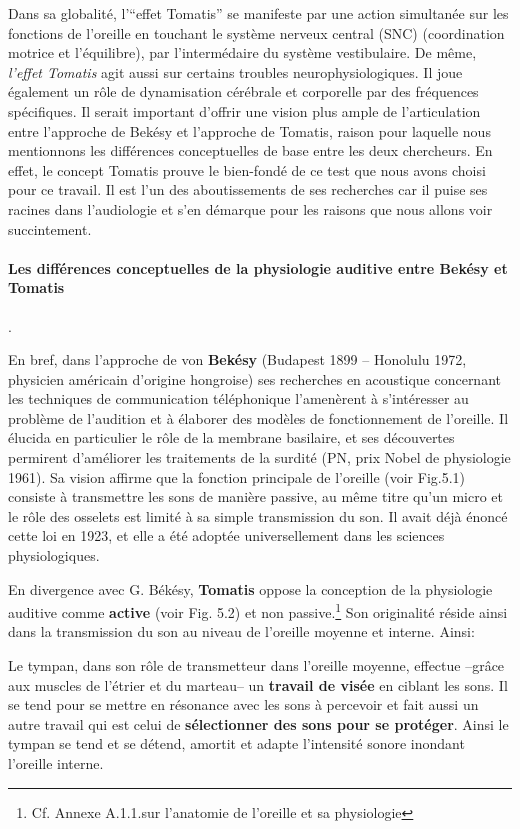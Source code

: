 Dans sa globalité, l'``effet Tomatis'' se manifeste par une action
simultanée sur les fonctions de
l'oreille en touchant le système nerveux central (SNC) (coordination
                motrice et l'équilibre), par l'intermédaire du système
                vestibulaire.
De même, \textit{l'effet Tomatis} agit aussi sur certains troubles
                neurophysiologiques.
                Il joue également un rôle de dynamisation cérébrale et corporelle
               par des fréquences spécifiques.
Il serait important d'offrir une vision plus ample de
l'articulation entre l'approche de Bekésy et l'approche de Tomatis,
raison pour laquelle nous mentionnons les différences conceptuelles de
base entre les deux chercheurs.
En effet, le concept Tomatis prouve le bien-fondé de ce test que nous
avons choisi pour ce travail.
Il est l'un des aboutissements de
ses recherches car il puise ses racines dans l'audiologie et s'en
démarque pour les raisons que nous allons voir succintement.
\paragraph{Les différences conceptuelles de la physiologie auditive
  entre Bekésy et Tomatis}.

En bref, dans  l'approche de von\textbf{ Bekésy} (Budapest 1899 -- Honolulu 1972,
physicien américain d'origine hongroise) ses
recherches en acoustique concernant les techniques de communication
téléphonique l'amenèrent à s'intéresser au problème de l'audition et à
élaborer des modèles de fonctionnement de l'oreille. Il élucida en
particulier le rôle de la membrane basilaire, et ses découvertes
permirent d'améliorer les traitements de la surdité (PN, prix 
Nobel de physiologie 1961).
Sa vision affirme que la fonction principale de l'oreille (voir Fig.5.1)
consiste à transmettre les sons de manière passive, au même titre qu'un micro et le rôle des osselets 
est limité à sa simple transmission du
son. Il avait déjà énoncé cette loi en 1923, et elle a été adoptée
universellement dans les sciences physiologiques.


En divergence avec G. Békésy, \textbf{Tomatis} oppose la conception de la 
physiologie auditive comme \textbf{active} (voir Fig. 5.2) et non passive.\footnote{Cf. Annexe A.1.1.sur l'anatomie de l'oreille et sa physiologie}
Son originalité réside ainsi dans la transmission du son
au niveau de l'oreille moyenne et interne. Ainsi: 

	Le tympan, dans son rôle de transmetteur dans l'oreille
          moyenne, effectue --grâce aux muscles de l'étrier et du marteau--
		un\textbf{ travail de visée} en ciblant les sons. Il 
se tend
		pour se mettre en résonance avec les sons à percevoir
                et fait aussi un autre travail qui est celui de \textbf{sélectionner des 
sons
		pour se protéger}. Ainsi le tympan se tend et se détend,
              amortit et adapte 
l'intensité
		sonore inondant  l'oreille interne. 

